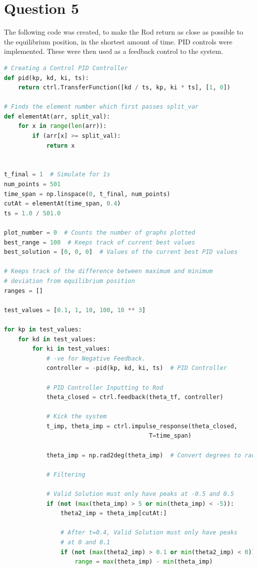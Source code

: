 \documentclass[a4paper,10pt,reqno]{article}
\numberwithin{equation}{section}
\begin{document}
\section{Question 5}
The following code was created, to make the Rod return as close as possible to the equilibrium position, in the shortest amount of time. PID controls were implemented. These were then used as a feedback control to the system.
\begin{lstlisting}[language=Python]
# Creating a Control PID Controller
def pid(kp, kd, ki, ts):
    return ctrl.TransferFunction([kd / ts, kp, ki * ts], [1, 0])

# Finds the element number which first passes split_var
def elementAt(arr, split_val):
    for x in range(len(arr)):
        if (arr[x] >= split_val):
            return x


t_final = 1  # Simulate for 1s
num_points = 501
time_span = np.linspace(0, t_final, num_points)
cutAt = elementAt(time_span, 0.4)
ts = 1.0 / 501.0

plot_number = 0  # Counts the number of graphs plotted
best_range = 100  # Keeps track of current best values
best_solution = [0, 0, 0]  # Values of the current best PID values

# Keeps track of the difference between maximum and minimum 
# deviation from equilibrium position
ranges = []

test_values = [0.1, 1, 10, 100, 10 ** 3]

for kp in test_values:
    for kd in test_values:
        for ki in test_values:
            # -ve for Negative Feedback.
            controller = -pid(kp, kd, ki, ts)  # PID Controller

            # PID Controller Inputting to Rod
            theta_closed = ctrl.feedback(theta_tf, controller)

            # Kick the system
            t_imp, theta_imp = ctrl.impulse_response(theta_closed,
            							 T=time_span)

            theta_imp = np.rad2deg(theta_imp)  # Convert degrees to radians

            # Filtering

            # Valid Solution must only have peaks at -0.5 and 0.5
            if (not (max(theta_imp) > 5 or min(theta_imp) < -5)):
                theta2_imp = theta_imp[cutAt:]

                # After t=0.4, Valid Solution must only have peaks 
                # at 0 and 0.1
                if (not (max(theta2_imp) > 0.1 or min(theta2_imp) < 0)):
                    range = max(theta_imp) - min(theta_imp)


\end{lstlisting}
\end{document}
